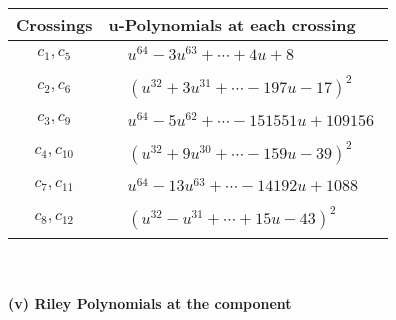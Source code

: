 \documentclass[1p]{elsarticle_modified}
\theoremstyle{definition}
\begin{document}
\begin{tabular}{m{50pt}|m{274pt}}
Crossings & \hspace{64pt}u-Polynomials at each crossing \\
\hline $$\begin{aligned}c_{1},c_{5}\end{aligned}$$&$\begin{aligned}
&u^{64}-3 u^{63}+\cdots+4 u+8
\end{aligned}$\\
\hline $$\begin{aligned}c_{2},c_{6}\end{aligned}$$&$\begin{aligned}
&(u^{32}+3 u^{31}+\cdots-197 u-17)^{2}
\end{aligned}$\\
\hline $$\begin{aligned}c_{3},c_{9}\end{aligned}$$&$\begin{aligned}
&u^{64}-5 u^{62}+\cdots-151551 u+109156
\end{aligned}$\\
\hline $$\begin{aligned}c_{4},c_{10}\end{aligned}$$&$\begin{aligned}
&(u^{32}+9 u^{30}+\cdots-159 u-39)^{2}
\end{aligned}$\\
\hline $$\begin{aligned}c_{7},c_{11}\end{aligned}$$&$\begin{aligned}
&u^{64}-13 u^{63}+\cdots-14192 u+1088
\end{aligned}$\\
\hline $$\begin{aligned}c_{8},c_{12}\end{aligned}$$&$\begin{aligned}
&(u^{32}- u^{31}+\cdots+15 u-43)^{2}
\end{aligned}$\\
\hline
\end{tabular}\\~\\
\newpage\renewcommand{\arraystretch}{1}
\flushleft \textbf{(v) Riley Polynomials at the component}\newline \\
\end{document}

